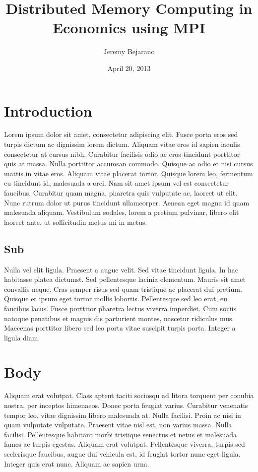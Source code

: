 \documentclass[12pt, oneside, letterpaper]{amsart}
\title[Distributed Memory Computing in Economics]{Distributed Memory Computing in Economics using MPI}
\author{Jeremy Bejarano}
\date{April 20, 2013}
\begin{document}
\maketitle

\section{Introduction}
Lorem ipsum dolor sit amet, consectetur adipiscing elit. Fusce porta eros sed turpis dictum ac dignissim lorem dictum. Aliquam vitae eros id sapien iaculis consectetur at cursus nibh. Curabitur facilisis odio ac eros tincidunt porttitor quis at massa. Nulla porttitor accumsan commodo. Quisque ac odio et nisi cursus mattis in vitae eros. Aliquam vitae placerat tortor. Quisque lorem leo, fermentum eu tincidunt id, malesuada a orci. Nam sit amet ipsum vel est consectetur faucibus. Curabitur quam magna, pharetra quis vulputate ac, laoreet ut elit. Nunc rutrum dolor ut purus tincidunt ullamcorper. Aenean eget magna id quam malesuada aliquam. Vestibulum sodales, lorem a pretium pulvinar, libero elit laoreet ante, ut sollicitudin metus mi in metus.

\subsection{Sub}
Nulla vel elit ligula. Praesent a augue velit. Sed vitae tincidunt ligula. In hac habitasse platea dictumst. Sed pellentesque lacinia elementum. Mauris sit amet convallis neque. Cras semper risus sed quam tristique ac placerat dui pretium. Quisque et ipsum eget tortor mollis lobortis. Pellentesque sed leo erat, eu faucibus lacus. Fusce porttitor pharetra lectus viverra imperdiet. Cum sociis natoque penatibus et magnis dis parturient montes, nascetur ridiculus mus. Maecenas porttitor libero sed leo porta vitae suscipit turpis porta. Integer a ligula diam.

\section{Body}
Aliquam erat volutpat. Class aptent taciti sociosqu ad litora torquent per conubia nostra, per inceptos himenaeos. Donec porta feugiat varius. Curabitur venenatis tempor leo, vitae dignissim libero malesuada at. Nulla facilisi. Proin ac nisi in quam vulputate vulputate. Praesent vitae nisl est, non varius massa. Nulla facilisi. Pellentesque habitant morbi tristique senectus et netus et malesuada fames ac turpis egestas. Aliquam erat volutpat. Pellentesque viverra, turpis sed scelerisque faucibus, augue dui vehicula est, id feugiat tortor nunc eget ligula. Integer quis erat nunc. Aliquam ac sapien urna.
\end{document}
